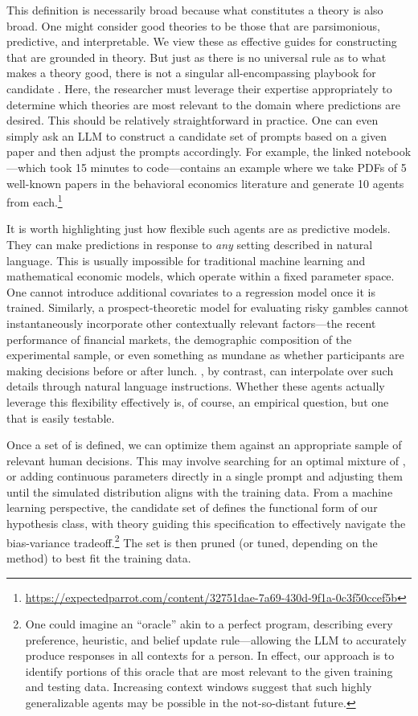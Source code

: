 This definition is necessarily broad because what constitutes a theory is also broad.
One might consider good theories to be those that are parsimonious, predictive, and interpretable.
We view these as effective guides for constructing  that are grounded in theory.
But just as there is no universal rule as to what makes a theory good, there is not a singular all-encompassing playbook for candidate .
Here, the researcher must leverage their expertise appropriately to determine which theories are most relevant to the domain where predictions are desired.
This should be relatively straightforward in practice.
One can even simply ask an LLM to construct a candidate set of prompts based on a given paper and then adjust the prompts accordingly.
For example, the linked notebook---which took 15 minutes to code---contains an example where we take PDFs of 5 well-known papers in the behavioral economics literature and generate 10 agents from each.\footnote{\url{https://expectedparrot.com/content/32751dae-7a69-430d-9f1a-0c3f50ccef5b}}

It is worth highlighting just how flexible such agents are as predictive models.
They can make predictions in response to \emph{any} setting described in natural language.
This is usually impossible for traditional machine learning and mathematical economic models, which operate within a fixed parameter space. 
One cannot introduce additional covariates to a regression model once it is trained. 
Similarly, a prospect-theoretic model for evaluating risky gambles cannot instantaneously incorporate other contextually relevant factors---the recent performance of financial markets, the demographic composition of the experimental sample, or even something as mundane as whether participants are making decisions before or after lunch. 
, by contrast, can interpolate over such details through natural language instructions. 
Whether these agents actually leverage this flexibility effectively is, of course, an empirical question, but one that is easily testable.

Once a set of  is defined, we can optimize them against an appropriate sample of relevant human decisions.
This may involve searching for an optimal mixture of , or adding continuous parameters directly in a single prompt and adjusting them until the simulated distribution aligns with the training data.
From a machine learning perspective, the candidate set of  defines the functional form of our hypothesis class, with theory guiding this specification to effectively navigate the bias-variance tradeoff.\footnote{One could imagine an ``oracle'' \persona{} akin to a perfect program, describing every preference, heuristic, and belief update rule---allowing the LLM to accurately produce responses in all contexts for a person.
In effect, our approach is to identify portions of this oracle that are most relevant to the given training and testing data.
Increasing context windows suggest that such highly generalizable agents may be possible in the not-so-distant future.}
The set is then pruned (or tuned, depending on the method) to best fit the training data.


